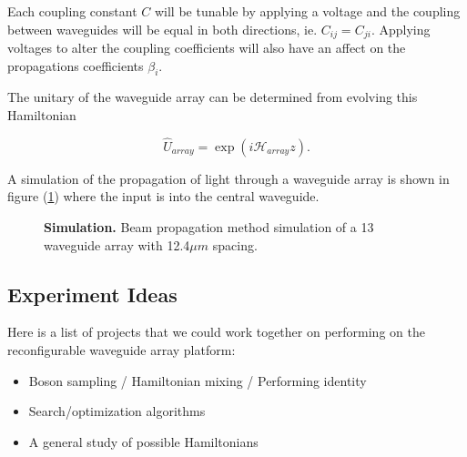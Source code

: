 \documentclass[11pt,a4paper]{article}
\begin{document}
\noindent Each coupling constant $C$ will be tunable by applying a voltage and the coupling between waveguides will be equal in both directions, ie. $C_{ij} = C_{ji}$. Applying voltages to alter the coupling coefficients will also have an affect on the propagations coefficients $\beta_i$.

The unitary of the waveguide array can be determined from evolving this Hamiltonian

\begin{equation}
\hat{U}_{array} = \exp(i\mathcal{H}_{array}z).
\end{equation}

A simulation of the propagation of light through a waveguide array is shown in figure (\ref{Figure:RSoft_Sim}) where the input is into the central waveguide.
 \\
\begin{figure}[h]
\caption{\small \textbf{Simulation.} Beam propagation method simulation of a 13 waveguide array with 12.4$\mu m$ spacing.}
\label{Figure:RSoft_Sim}
\end{figure}

\subsection*{Experiment Ideas}

Here is a list of projects that we could work together on performing on the reconfigurable waveguide array platform:

\begin{itemize}
\item Boson sampling / Hamiltonian mixing / Performing identity
\item Search/optimization algorithms
\item A general study of possible Hamiltonians
\end{itemize}
\end{document}
